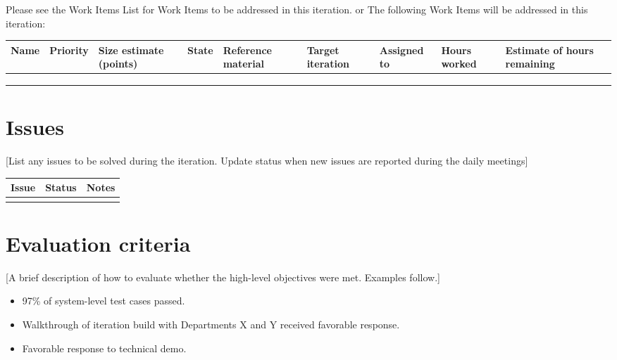 \documentclass{article}%
\begin{document}
Please see the Work Items List for Work Items to be addressed in this iteration.
or
The following Work Items will be addressed in this iteration:

\begin{adjustbox}{width=\textwidth}
\begin{tabular}{|l|l|l|l|l|l|l|l|l|}
\hline
Name & Priority & Size estimate (points) & State & Reference material & Target iteration & Assigned to & Hours worked & Estimate of hours remaining \\ \hline
     &          &                        &       &                    &                  &             &              &                             \\ \hline
     &          &                        &       &                    &                  &             &              &                             \\ \hline
     &          &                        &       &                    &                  &             &              &                             \\ \hline
\end{tabular}
\end{adjustbox}

\section{Issues}

 [List any issues to be solved during the iteration. Update status when new issues are reported during the daily meetings]


\begin{tabular}{|l|l|l|}
\hline
Issue & Status & Notes \\
\hline
 &  & \\
\hline
\end{tabular}

\section{Evaluation criteria}

[A brief description of how to evaluate whether the high-level objectives were met. Examples follow.]

\begin{itemize}
	\item 97\% of system-level test cases passed.
	\item	Walkthrough of iteration build with Departments X and Y received favorable response.
	\item Favorable response to technical demo.
\end{itemize}
\end{document}
